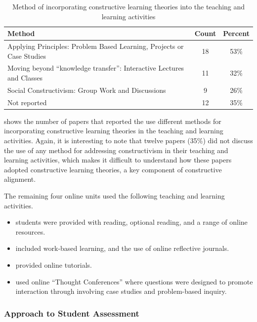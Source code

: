 \begin{table}[tpb]
	\centering
	\caption{Method of incorporating constructive learning theories into the teaching and learning activities}
	\label{tbl:class_constructive}
	\footnotesize
    \begin{tabular}{l|c|c}
    \textbf{Method} & \textbf{Count} & \textbf{Percent} \\ \hline
    Applying Principles: Problem Based Learning, Projects or Case Studies & 18 & 53\% \\
    Moving beyond ``knowledge transfer'': Interactive Lectures and Classes & 11 & 32\% \\
    Social Constructivism: Group Work and Discussions & 9 & 26\% \\
    Not reported & 12 & 35\% \\
    \end{tabular}
\end{table}

 shows the number of papers that reported the use different methods for incorporating constructive learning theories in the teaching and learning activities. Again, it is interesting to note that twelve papers (35\%) did not discuss the use of any method for addressing constructivism in their teaching and learning activities, which makes it difficult to understand how these papers adopted constructive learning theories, a key component of constructive alignment.

The remaining four online units used the following teaching and learning activities.

\begin{itemize}[noitemsep,nolistsep]
	\item \citet{hoddinott2000biggs} students were provided with reading, optional reading, and a range of online resources.
	\item \citet{raeburn2009blended} included work-based learning, and the use of online reflective journals.
	\item \citet{terrell2011using} provided online tutorials.
	\item \citet{brown2006looking} used online ``Thought Conferences'' where questions were designed to promote interaction through involving case studies and problem-based inquiry.
\end{itemize}

\subsubsection{Approach to Student Assessment} %
\label{sub:review_assessment_approach}


